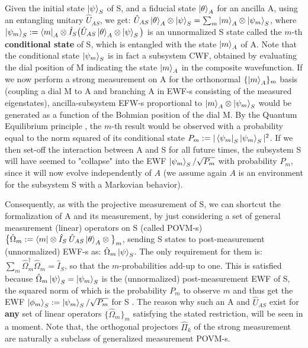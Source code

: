 \documentclass[11pt, a4paper]{article} %
\begin{document}
Given the initial state $\ket{\psi}_S$ of S, and a fiducial state $\ket{\theta}_A$ for an ancilla A, using an entangling unitary $\hat{U}_{AS}$, we get: $\hat{U}_{AS}\ket{\theta}_A\otimes\ket{\psi}_S=\sum_m \ket{m}_A\otimes \ket{\psi_m}_S$, where $\ket{\psi_m}_S:=\bra{m}_A\otimes\hat{I}_S \big(\hat{U}_{AS}\ket{\theta}_A\otimes\ket{\psi}_S\big)$ is an unnormalized S state called the $m$-th {\bf conditional state} of S, which is entangled with the state $\ket{m}_A$ of A. Note that the conditional state $\ket{\psi_m}_S$ is in fact a subsystem CWF, obtained by evaluating the dial position of M indicating the state $\ket{m}_A$ in the composite wavefunction. If we now perform a strong measurement on A for the orthonormal $\{\ket{m}_A\}_m$ basis (coupling a dial M to A and branching A in EWF-s consisting of the measured eigenstates), ancilla-subsystem EFW-s proportional to $\ket{m}_A\otimes \ket{\psi_m}_S$ would be generated as a function of the Bohmian position of the dial M. By the Quantum Equilibrium principle \cite{Absolute}, the $m$-th result would be observed with a probability equal to the norm squared of its conditional state $P_m:=|\bra{\psi_m}_S\ket{\psi_m}_S|^2$. If we then set-off the interaction between A and S for all future times, the subsystem S will have seemed to "collapse" into the EWF $\ket{\psi_m}_S/\sqrt{P_m}$ with probability $P_m$, since it will now evolve independently of $A$ (we assume again $A$ is an environment for the subsystem S with a Markovian behavior). %

Consequently, as with the projective measurement of S, we can shortcut the formalization of A and its measurement, by just considering a set of general measurement (linear) operators on S (called POVM-s) $\big\{\hat{\Omega}_m:=\bra{m}\otimes\hat{I}_S\:\hat{U}_{AS}\ket{\theta}_A\otimes\big\}_m$, sending S states to post-measurement (unnormalized) EWF-s as: $\hat{\Omega}_m\ket{\psi}_S$. The only requirement for them is: $\sum_m \hat{\Omega}_m^\dagger\hat{\Omega}_m=\hat{I}_S$, so that the $m$-probabilities add-up to one. This is satisfied because $\hat{\Omega}_m\ket{\psi}_S=\ket{\psi_m}_S$ is the (unnormalized) post-measurement EWF of S, the squared norm of which is the probability $P_m$ to observe $m$ and thus get the EWF $\ket{\phi_m}_S:=\ket{\psi_m}_S/\sqrt{P_m}$ for S \cite{Generalized, Durr}. The reason why such an A and $\hat{U}_{AS}$  exist for {\bf any} set of linear operators $\{\hat{\Omega}_m\}_m$ satisfying the stated restriction, will be seen in a moment. Note that, the orthogonal projectors $\hat{\Pi}_k$ of the strong measurement are naturally a subclass of generalized measurement POVM-s.\vspace{-0.15cm}
\end{document}
